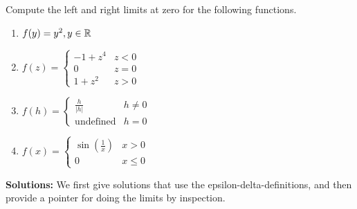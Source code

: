 \bigskip

\begin{example} 
\label{ex:LeftRightLimitsAtZero}
Compute the left and right limits at zero for the following functions.
\begin{enumerate}
\renewcommand{\labelenumi}{(\alph{enumi})}
\setlength{\itemsep}{.2cm}

  \item  $f(y) = y^2, y\in \mathbb R $

  \item $f(z) =  \begin{cases} 
       -1 + z^4 & z < 0\\
        0 & z = 0 \\
        1 + z^2 & z > 0
    \end{cases}$
    
    \item  $f(h) = \begin{cases} 
        \frac{h}{|h|}  & h \ne 0 \\
        \text{undefined} & h = 0
    \end{cases}$

    \item $f(x) = \begin{cases} 
        \sin(\frac{1}{x}) & x >0 \\
        0 & x \le 0
    \end{cases}$

    \end{enumerate}
    
\end{example}

\textbf{Solutions:} We first give solutions that use the epsilon-delta-definitions, and then provide a pointer for doing the limits by inspection. 

